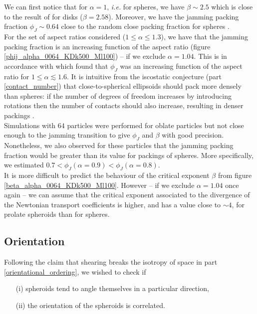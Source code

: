 \documentclass[class=report, float=false, crop=false]{standalone}
\begin{document}
We can first notice that for $\alpha=1$, \textit{i.e.} for spheres, we have $\beta\sim2.5$ which is close to the result of \cite{PRL109.108001} for disks ($\beta=2.58$). Moreover, we have the jamming packing fraction $\phi_J\sim0.64$ close to the random close packing fraction for spheres \cite{donev2004improving}.\\

For the set of aspect ratios considered ($1\le\alpha\le1.3$), we have that the jamming packing fraction is an increasing function of the aspect ratio (figure \ref{phij_alpha_0064_KDk500_Ml100}) -- if we exclude $\alpha=1.04$. This is in accordance with \cite{donev2004improving} which found that $\phi_J$ was an increasing function of the aspect ratio for $1\le\alpha\lesssim1.6$. It is intuitive from the iscostatic conjecture (part \ref{contact_number}) that close-to-spherical ellipsoids should pack more densely than spheres: if the number of degrees of freedom increases by introducing rotations then the number of contacts should also increase, resulting in denser packings \cite{chaikin2006some}.\\

Simulations with $64$ particles were performed for oblate particles but not close enough to the jamming transition to give $\phi_J$ and $\beta$ with good precision. Nonetheless, we also observed for these particles that the jamming packing fraction would be greater than its value for packings of spheres. More specifically, we estimated $0.7 < \phi_J(\alpha=0.9) < \phi_J(\alpha=0.8)$.\\

It is more difficult to predict the behaviour of the critical exponent $\beta$ from figure \ref{beta_alpha_0064_KDk500_Ml100}. However -- if we exclude $\alpha=1.04$ once again -- we can assume that the critical exponent associated to the divergence of the Newtonian transport coefficients is higher, and has a value close to $\sim 4$, for prolate spheroids than for spheres.

\subsection{Orientation}

Following the claim that shearing breaks the isotropy of space in part \ref{orientational_ordering}, we wished to check if
\begin{itemize}
\item[(i)] spheroids tend to angle themselves in a particular direction,
\item[(ii)] the orientation of the spheroids is correlated.
\end{itemize}
\end{document}

